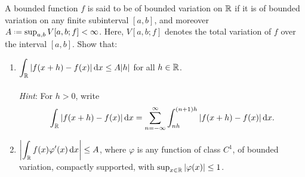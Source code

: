 \begin{problem}
  A bounded function \(f\) is said to be of bounded variation on \(\mathbb{R}\)
  if it is of bounded variation on any finite subinterval \([a,b]\), and
  moreover \(A\defeq\sup_{a,b}V[a,b;f]<\infty\). Here, \(V[a,b;f]\) denotes the
  total variation of \(f\) over the interval \([a,b]\). Show that:
\begin{enumerate}[label=(\alph*),noitemsep]
\item \(\displaystyle\int_{\mathbb{R}}|f(x+h)-f(x)|\mathop{}\!\mathrm{d} x\leq A|h|\) for all
  \(h\in\mathbb{R}\).
  \\\\
  \emph{Hint}: For \(h>0\), write
  \[
    \int_{\mathbb{R}} |f(x+h)-f(x)|\mathop{}\!\mathrm{d} x=
    \sum_{n=-\infty}^\infty\int_{nh}^{(n+1)h}|f(x+h)-f(x)|\mathop{}\!\mathrm{d} x.
  \]
\item
  \(\displaystyle\left|\int_{\mathbb{R}} f(x)\varphi'(x)\mathop{}\!\mathrm{d} x\right|\leq A\),
  where \(\varphi\) is any function of class \(C^1\), of bounded variation,
  compactly supported, with \(\sup_{x\in\mathbb{R}}|\varphi(x)|\leq 1\).
\end{enumerate}
\end{problem}
